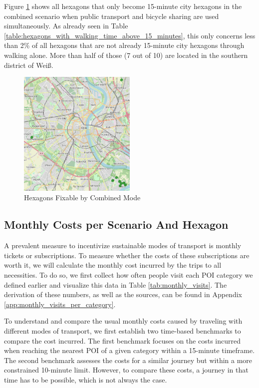 Figure \ref{fig:combined_hexagons} shows all hexagons that only become 15-minute city hexagons in the combined scenario when public transport and bicycle sharing are used simultaneously.
As already seen in Table \ref{table:hexagons_with_walking_time_above_15_minutes}, this only concerns less than 2\% of all hexagons that are not already 15-minute city hexagons through walking alone.
More than half of those (7 out of 10) are located in the southern district of Weiß.
\begin{figure}
  \begin{center}
    \includegraphics[width=0.50\textwidth]{Figures/results/problematic_hexagons/combined_hexagons}
  \end{center}
  \caption{Hexagons Fixable by Combined Mode}
  \label{fig:combined_hexagons}
\end{figure}


\subsection{Monthly Costs per Scenario And Hexagon}
\label{sec:monthly_costs}
A prevalent measure to incentivize sustainable modes of transport is monthly tickets or subscriptions.
To measure whether the costs of these subscriptions are worth it, we will calculate the monthly cost incurred by the trips to all necessities.
To do so, we first collect how often people visit each POI category we defined earlier and visualize this data in Table \ref{tab:monthly_visits}.
The derivation of these numbers, as well as the sources, can be found in Appendix \ref{app:monthly_visits_per_category}.

To understand and compare the usual monthly costs caused by traveling with different modes of transport, we first establish two time-based benchmarks to compare the cost incurred.
The first benchmark focuses on the costs incurred when reaching the nearest POI of a given category within a 15-minute timeframe. 
The second benchmark assesses the costs for a similar journey but within a more constrained 10-minute limit.
However, to compare these costs, a journey in that time has to be possible, which is not always the case.

